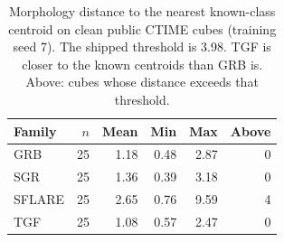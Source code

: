 \begin{table}[t]
\caption{Morphology distance to the nearest known-class centroid on clean public CTIME cubes (training seed 7). The shipped threshold is 3.98. TGF is closer to the known centroids than GRB is. Above: cubes whose distance exceeds that threshold.}
\label{tab:morph}
\centering
\small
\begin{tabular}{lrrrrr}
\toprule
Family & $n$ & Mean & Min & Max & Above \\
\midrule
GRB & 25 & 1.18 & 0.48 & 2.87 & 0 \\
SGR & 25 & 1.36 & 0.39 & 3.18 & 0 \\
SFLARE & 25 & 2.65 & 0.76 & 9.59 & 4 \\
TGF & 25 & 1.08 & 0.57 & 2.47 & 0 \\
\bottomrule
\end{tabular}
\end{table}
